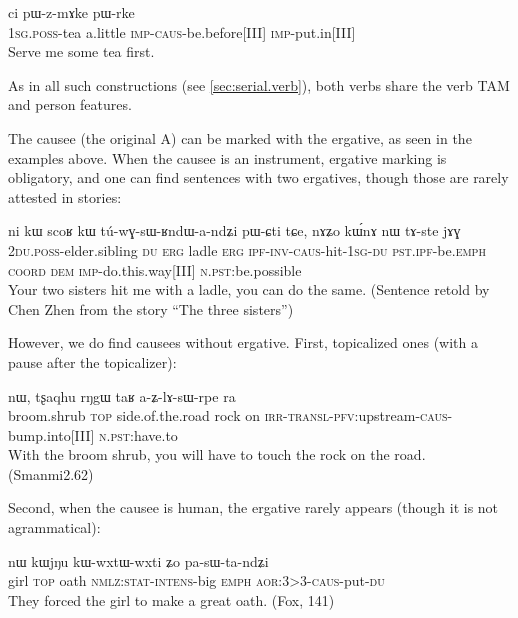 \documentclass[oldfontcommands,oneside,a4paper,11pt]{memoir}
\newcommand{\ipa}[1]{{\phon #1}} %
\newcommand{\wav}[1]{}%
\newcommand{\aor}{\textsc{aor}}
\newcommand{\caus}{\textsc{caus}}
\newcommand{\coord}{\textsc{coord}}
\newcommand{\dem}{\textsc{dem}}
\newcommand{\du}{\textsc{du}}
\newcommand{\erg}{\textsc{erg}}
\newcommand{\emphat}{\textsc{emph}}
\newcommand{\imp}{\textsc{imp}}
\newcommand{\intens}{\textsc{intens}}
\newcommand{\inv}{\textsc{inv}}
\newcommand{\ipf}{\textsc{ipf}}
\newcommand{\irr}{\textsc{irr}}
\newcommand{\nmlz}{\textsc{nmlz}}
\newcommand{\npst}{\textsc{n.pst}}
\newcommand{\pfv}{\textsc{pfv}}
\newcommand{\poss}{\textsc{poss}}
\newcommand{\pst}{\textsc{pst}}
\newcommand{\sg}{\textsc{sg}}
\newcommand{\stat}{\textsc{stat}}
\newcommand{\topic}{\textsc{top}}
\newcommand{\transloc}{\textsc{transl}}
\begin{document}
\begin{exe}
\ex
\gll \ipa{a-tʂha} 	\ipa{ci} 	\ipa{pɯ-z-mɤke} 	\ipa{pɯ-rke} \\
1\sg{}.\poss{}-tea a.little \imp{}-\caus{}-be.before[III] \imp{}-put.in[III] \\
\glt  Serve me some tea first.
\end{exe} 
As in all such constructions (see \ref{sec:serial.verb}), both verbs share the verb TAM and person features.

 
The causee (the original A) can be marked with the ergative, as seen in the examples above. When the causee is an instrument, ergative marking is obligatory, and one can find sentences with two ergatives, though those are rarely attested in stories:
\begin{exe}
\ex
\gll \ipa{nɤ-pi} 	\ipa{ni} 	\ipa{kɯ} 	\ipa{scoʁ} 	\ipa{kɯ} 	\ipa{tú-wɣ-sɯ-ʁndɯ-a-ndʑi} 	\ipa{pɯ-ɕti} 	\ipa{tɕe,} 	\ipa{nɤʑo} 	\ipa{kɯ́nɤ} 	\ipa{nɯ} 	\ipa{tɤ-ste} 	\ipa{jɤɣ}  \\
2\du{}.\poss{}-elder.sibling \du{} \erg{} ladle \erg{} \ipf{}-\inv{}-\caus{}-hit-1\sg{}-\du{} \pst{}.\ipf{}-be.\emphat{} \coord{} \dem{} \imp{}-do.this.way[III] \npst{}:be.possible  \\
\glt   Your two sisters hit me with a ladle, you can do the same. (Sentence retold by Chen Zhen from the story ``The three sisters'') \wav{8_scoRkW}
\end{exe} 


However, we do find  causees without ergative. First, topicalized ones (with a pause after the topicalizer):
\begin{exe}
\ex
\gll  \ipa{phuɲi} 	\ipa{nɯ}, 	\ipa{tʂaqhu} 	\ipa{rŋgɯ} 	\ipa{taʁ} 	\ipa{a-ʑ-lɤ-sɯ-rpe} 	\ipa{ra}  \\
 broom.shrub \topic{} side.of.the.road rock on \irr{}-\transloc{}-\pfv{}:upstream-\caus{}-bump.into[III] \npst{}:have.to   \\
 \glt   With the broom shrub, you will have to touch the rock on the road. (Smanmi2.62)
\end{exe} 
 

 
Second, when the causee is human, the ergative rarely appears (though it is not agrammatical): 
 
 \begin{exe}
\ex
\gll \ipa{tɕheme} 	\ipa{nɯ} 	\ipa{kɯjŋu} 	\ipa{kɯ-wxtɯ-wxti} 	\ipa{ʑo} 	\ipa{pa-sɯ-ta-ndʑi} \\
girl \topic{} oath \nmlz{}:\stat{}-\intens{}-big \emphat{} \aor{}:3>3-\caus{}-put-\du{} \\
 \glt   They forced the girl to make a great oath. (Fox, 141)
\end{exe} 
  
\end{document}
